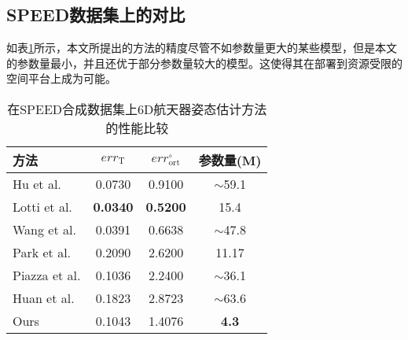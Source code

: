 \subsection{SPEED数据集上的对比}
如表\ref{tab:SPEED_Comparison}所示，本文所提出的方法的精度尽管不如参数量更大的某些模型，但是本文的参数量最小，并且还优于部分参数量较大的模型。这使得其在部署到资源受限的空间平台上成为可能。
\begin{table}[htbp]
	\centering
	\caption{在SPEED合成数据集上6D航天器姿态估计方法的性能比较}
	\label{tab:SPEED_Comparison}
	\begin{tabular}{lccc}
		\toprule
		方法 & $err_{\text{T}}$ & $err_{\text{ort}}^{\circ}$ & 参数量(M) \\
		\midrule
		Hu et al.\citep{gerard2019segmentation} & 0.0730 & 0.9100 & $\sim$59.1 \\
		Lotti et al.\citep{lotti2022investigating} & \textbf{0.0340} & \textbf{0.5200} & 15.4 \\
		Wang et al.\citep{wang2022revisiting} & 0.0391 & 0.6638 & $\sim$47.8 \\
		Park et al.\citep{park2019towards} & 0.2090 & 2.6200 & 11.17 \\
		Piazza et al.\citep{piazza2021deep} & 0.1036 & 2.2400 & $\sim$36.1 \\
		Huan et al.\citep{huan2020pose} & 0.1823 & 2.8723 & $\sim$63.6 \\
		Ours & 0.1043 & 1.4076 & \textbf{4.3} \\
		\bottomrule
	\end{tabular}
\end{table}

